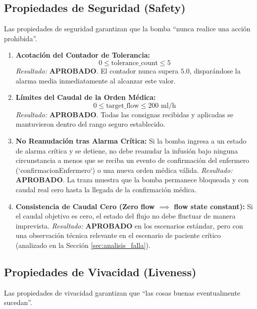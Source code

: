 \documentclass[11pt,a4paper]{article}
\begin{document}
\subsection{Propiedades de Seguridad (Safety)}
Las propiedades de seguridad garantizan que la bomba ``nunca realice una acción prohibida''.

\begin{enumerate}
    \item \textbf{Acotación del Contador de Tolerancia:}
    \[ 0 \leq \text{tolerance\_count} \leq 5 \]
    \textit{Resultado:} \textbf{APROBADO}. El contador nunca supera $5.0$, disparándose la alarma media inmediatamente al alcanzar este valor.
    
    \item \textbf{Límites del Caudal de la Orden Médica:}
    \[ 0 \leq \text{target\_flow} \leq 200\text{ ml/h} \]
    \textit{Resultado:} \textbf{APROBADO}. Todas las consignas recibidas y aplicadas se mantuvieron dentro del rango seguro establecido.
    
    \item \textbf{No Reanudación tras Alarma Crítica:}
    Si la bomba ingresa a un estado de alarma crítica y se detiene, no debe reanudar la infusión bajo ninguna circunstancia a menos que se reciba un evento de confirmación del enfermero (`confirmacionEnfermero`) o una nueva orden médica válida.
    \textit{Resultado:} \textbf{APROBADO}. La traza muestra que la bomba permanece bloqueada y con caudal real cero hasta la llegada de la confirmación médica.
    
    \item \textbf{Consistencia de Caudal Cero (Zero flow $\implies$ flow state constant):}
    Si el caudal objetivo es cero, el estado del flujo no debe fluctuar de manera imprevista.
    \textit{Resultado:} \textbf{APROBADO} en los escenarios estándar, pero con una observación técnica relevante en el escenario de paciente crítico (analizado en la Sección \ref{sec:analisis_falla}).
\end{enumerate}

\subsection{Propiedades de Vivacidad (Liveness)}
Las propiedades de vivacidad garantizan que ``las cosas buenas eventualmente sucedan''.
\end{document}
